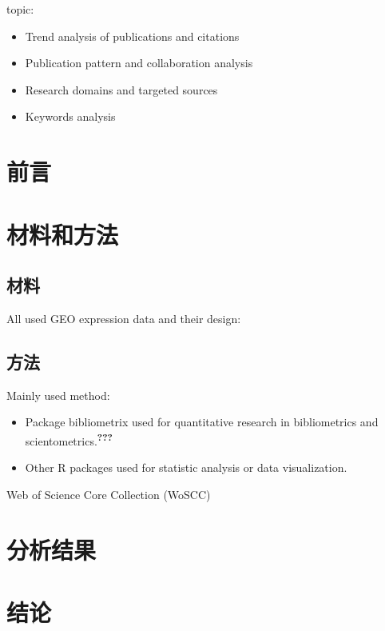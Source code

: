 \documentclass[
]{article}
\providecommand{\tightlist}{%
  \setlength{\itemsep}{0pt}\setlength{\parskip}{0pt}}
\begin{document}
topic:

\begin{itemize}
\tightlist
\item
  Trend analysis of publications and citations
\item
  Publication pattern and collaboration analysis
\item
  Research domains and targeted sources
\item
  Keywords analysis
\end{itemize}

\hypertarget{introduction}{%
\section{前言}\label{introduction}}

\hypertarget{methods}{%
\section{材料和方法}\label{methods}}

\hypertarget{ux6750ux6599}{%
\subsection{材料}\label{ux6750ux6599}}

All used GEO expression data and their design:

\hypertarget{ux65b9ux6cd5}{%
\subsection{方法}\label{ux65b9ux6cd5}}

Mainly used method:

\begin{itemize}
\tightlist
\item
  Package bibliometrix used for quantitative research in bibliometrics and scientometrics.\textsuperscript{{\textbf{???}}}
\item
  Other R packages used for statistic analysis or data visualization.
\end{itemize}

Web of Science Core Collection (WoSCC)

\hypertarget{results}{%
\section{分析结果}\label{results}}

\hypertarget{dis}{%
\section{结论}\label{dis}}
\end{document}
